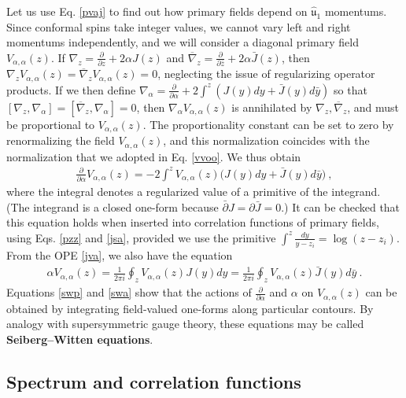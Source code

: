 \documentclass[12pt, a4paper, notitlepage, twoside]{report}
\numberwithin{equation}{section}
\theoremstyle{break}
\begin{document}
Let us use Eq. \eqref{pvaj} to find out how primary fields depend on $\hat{\mathfrak{u}}_1$ momentums. 
Since conformal spins take integer values, we cannot vary left and right momentums independently, and we will consider a diagonal primary field $V_{\alpha,\alpha}(z)$. 
If $\nabla_z={\frac{\partial}{\partial z}} +2\alpha J(z)$ and $\overline{\nabla}_{z}={\frac{\partial}{\partial \bar z}} +2\alpha \bar J(z)$, then $\nabla_z V_{\alpha,\alpha}(z)=\overline{\nabla}_z V_{\alpha,\alpha}(z)=0$, neglecting the issue of regularizing operator products.
If we then define $\nabla_\alpha = {\frac{\partial}{\partial \alpha}}+2\int^z (J(y)dy +\bar J(y)d\bar y)$ so that $[\nabla_z,\nabla_\alpha]=[\overline{\nabla}_z,\nabla_\alpha]=0$, then $\nabla_\alpha V_{\alpha,\alpha}(z)$ is annihilated by $\nabla_z,\overline{\nabla}_z$, and must be proportional to $V_{\alpha,\alpha}(z)$.
The proportionality constant can be set to zero by renormalizing the field $V_{\alpha,\alpha}(z)$, and this normalization coincides with the normalization that we adopted in Eq. \eqref{vvoo}.
We thus obtain
\begin{align}
 {\frac{\partial}{\partial \alpha}} V_{\alpha,\alpha}(z) 
 = -2 \int^z V_{\alpha,\alpha}(z)\Big(J(y)dy+\bar J(y)d\bar y \Big)\ ,
\label{swp}
\end{align}
where the integral denotes a regularized value of a primitive of the integrand. (The integrand is a closed one-form because $\bar\partial J = \partial \bar J=0$.)
It can be checked that this equation holds when inserted into correlation functions of primary fields, using Eqs. \eqref{pzz} and \eqref{jsa}, provided we use the primitive $\int^z \frac{dy}{y-z_i} = \log(z-z_i)$.
From the OPE \eqref{jva}, we also have the equation
\begin{align}
 \alpha V_{\alpha,\alpha}(z) 
 = \frac{1}{2\pi i} \oint_{z} V_{\alpha,\alpha}(z)J(y)dy
 = \frac{1}{2\pi i} \oint_{z} V_{\alpha,\alpha}(z)\bar J(y)d\bar y\ .
\label{swa}
\end{align}
Equations \eqref{swp} and \eqref{swa} show that the actions of ${\frac{\partial}{\partial \alpha}}$ and $\alpha$ on $V_{\alpha,\alpha}(z)$ can be obtained by integrating field-valued one-forms along particular contours.
By analogy with supersymmetric gauge theory, these equations may be called \textbf{\boldmath Seiberg--Witten equations}. 


\subsection{Spectrum and correlation functions \label{secsacf}}
\end{document}
